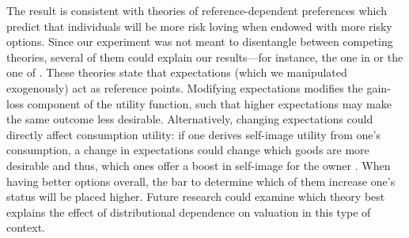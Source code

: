 The result is consistent with theories of reference-dependent preferences which predict that individuals will be more risk loving when endowed with more risky options.
Since our experiment was not meant to disentangle between competing theories, several of them could explain our results---for instance, the one in \cite{Koszegi2006,Koszegi2007} or the one of \cite{Wenner2015}.
These theories state that expectations (which we manipulated exogenously) act as reference points.
Modifying expectations modifies the gain-loss component of the utility function, such that higher expectations may make the same outcome less desirable.
Alternatively, changing expectations could directly affect consumption utility: if one derives self-image utility from one's consumption, a change in expectations could change which goods are more desirable and thus, which ones offer a boost in self-image for the owner \citep{Strahilevitz1998,Marzilli2011}.
When having better options overall, the bar to determine which of them increase one's status will be placed higher.
Future research could examine which theory best explains the effect of distributional dependence on valuation in this type of context.

%
%
%



\clearpage
\pagebreak



